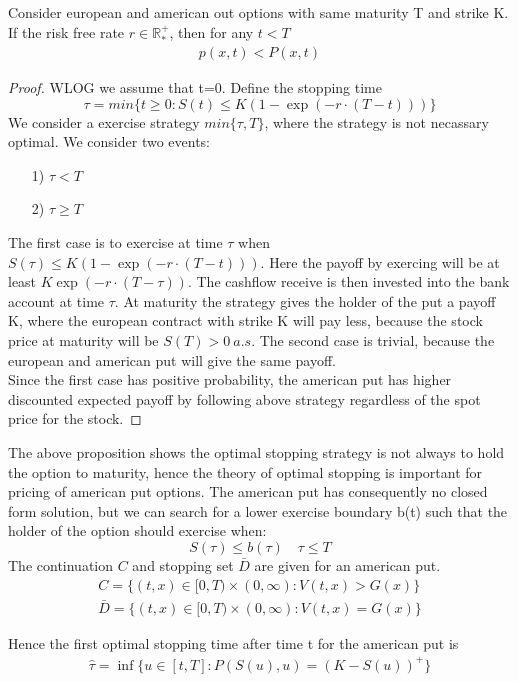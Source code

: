 \begin{proposition}{}
Consider european and american out options with same maturity T and strike K. If the risk free rate $r\in \mathbb{R}_*^+$, then for any $t<T$
\begin{equation}
\begin{split}
p(x,t)<P(x,t)
\end{split}
\end{equation}
\begin{proof}
WLOG we assume that t=0. Define the stopping time
$$\tau = min \{t\geq 0 : S(t) \leq K(1-\exp(-r\cdot (T-t)))\}$$
We consider a exercise strategy $min\{\tau, T\}$, where the strategy is not necassary optimal. We consider two events:
\begin{enumerate}
\item[1)] $\tau<T$
\item[2)] $\tau \geq T$
\end{enumerate}
The first case is to exercise at time $\tau$ when $S(\tau) \leq K(1-\exp(-r\cdot (T-t)))$. Here the payoff by exercing will be at least $K\exp(-r\cdot (T-\tau))$. The cashflow receive is then invested into the bank account at time $\tau$. At maturity the strategy gives the holder of the put a payoff K, where the european contract with strike K will pay less, because the stock price at maturity will be $S(T)>0 \ a.s.$
The second case is trivial, because the european and american put will give the same payoff. \\
Since the first case has positive probability, the american put has higher discounted expected payoff by following above strategy regardless of the spot price for the stock. 
\end{proof}
\end{proposition}
The above proposition shows the optimal stopping strategy is not always to hold the option to maturity, hence the theory of optimal stopping is important for pricing of american put options. The american put has consequently no closed form solution, but we can search for a lower exercise boundary b(t) such that the holder of the option should exercise when:
$$S(\tau)\leq b(\tau) \quad \tau \leq T$$
The continuation $C$ and stopping set $\bar{D}$ are given for an american put.
\begin{align}
C=\{(t,x) \in [0,T) \times (0,\infty) : V(t,x) > G(x) \}\\
\bar{D}=\{(t,x) \in [0,T) \times (0,\infty) : V(t,x) = G(x) \}
\end{align} 

Hence the first optimal stopping time after time t for the american put is
\begin{equation}
\begin{split}
\hat{\tau}= \inf\{u \in [t,T] : P(S(u),u) = (K-S(u))^+ \}
\end{split}
\end{equation}



